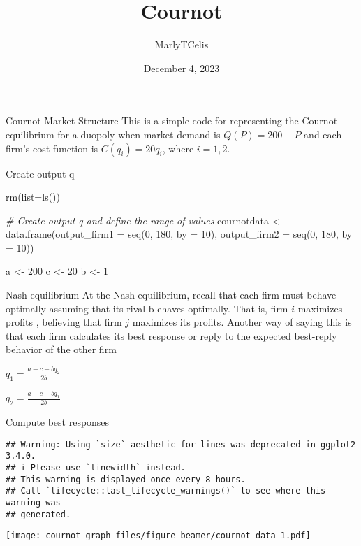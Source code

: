 \documentclass[
  ignorenonframetext,
]{beamer}
\title{Cournot}
\author{MarlyTCelis}
\date{December 4, 2023}
\newenvironment{Shaded}{\begin{snugshade}}{\end{snugshade}}
\newcommand{\AttributeTok}[1]{\textcolor[rgb]{0.77,0.63,0.00}{#1}}
\newcommand{\CommentTok}[1]{\textcolor[rgb]{0.56,0.35,0.01}{\textit{#1}}}
\newcommand{\DecValTok}[1]{\textcolor[rgb]{0.00,0.00,0.81}{#1}}
\newcommand{\FunctionTok}[1]{\textcolor[rgb]{0.00,0.00,0.00}{#1}}
\newcommand{\NormalTok}[1]{#1}
\newcommand{\OtherTok}[1]{\textcolor[rgb]{0.56,0.35,0.01}{#1}}
\begin{document}
\frame{\titlepage}

\begin{frame}{Cournot Market Structure}
\protect\hypertarget{cournot-market-structure}{}
This is a simple code for representing the Cournot equilibrium for a
duopoly when market demand is \(Q(P)=200-P\) and each firm's cost
function is \(C(q_i )=20q_i\), where \(i=1,2\).
\end{frame}

\begin{frame}[fragile]{Create output q}
\protect\hypertarget{create-output-q}{}
\begin{Shaded}
\begin{Highlighting}[]
\FunctionTok{rm}\NormalTok{(}\AttributeTok{list=}\FunctionTok{ls}\NormalTok{())}

\CommentTok{\# Create output q and define the range of values}
\NormalTok{cournotdata }\OtherTok{\textless{}{-}} \FunctionTok{data.frame}\NormalTok{(}\AttributeTok{output\_firm1 =} \FunctionTok{seq}\NormalTok{(}\DecValTok{0}\NormalTok{, }\DecValTok{180}\NormalTok{, }\AttributeTok{by =} \DecValTok{10}\NormalTok{),}
                 \AttributeTok{output\_firm2 =} \FunctionTok{seq}\NormalTok{(}\DecValTok{0}\NormalTok{, }\DecValTok{180}\NormalTok{, }\AttributeTok{by =} \DecValTok{10}\NormalTok{))}


\NormalTok{a }\OtherTok{\textless{}{-}} \DecValTok{200}
\NormalTok{c }\OtherTok{\textless{}{-}} \DecValTok{20}
\NormalTok{b }\OtherTok{\textless{}{-}} \DecValTok{1}
\end{Highlighting}
\end{Shaded}
\end{frame}

\begin{frame}{Nash equilibrium}
\protect\hypertarget{nash-equilibrium}{}
At the Nash equilibrium, recall that each firm must behave optimally
assuming that its rival b ehaves optimally. That is, firm \(i\)
maximizes profits , believing that firm \(j\) maximizes its profits.
Another way of saying this is that each firm calculates its best
response or reply to the expected best-reply behavior of the other firm

\(q_1=\frac{a-c-bq_2}{2b}\)

\(q_2=\frac{a-c-bq_1}{2b}\)
\end{frame}

\begin{frame}[fragile]{Compute best responses}
\protect\hypertarget{compute-best-responses}{}
\begin{verbatim}
## Warning: Using `size` aesthetic for lines was deprecated in ggplot2 3.4.0.
## i Please use `linewidth` instead.
## This warning is displayed once every 8 hours.
## Call `lifecycle::last_lifecycle_warnings()` to see where this warning was
## generated.
\end{verbatim}

\texttt{[image: cournot\_graph\_files/figure-beamer/cournot data-1.pdf]}
\end{frame}
\end{document}
